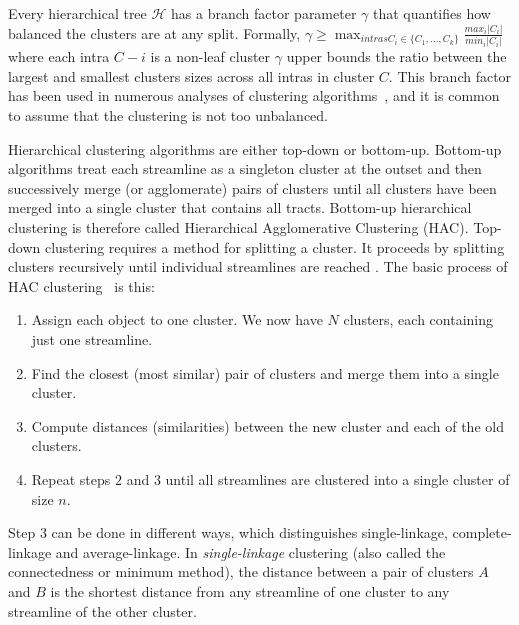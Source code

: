 Every hierarchical tree $\mathcal{H}$ has a branch factor parameter $\gamma$ that quantifies how balanced the clusters are at any split.
Formally, $\gamma \geq \max_{intras C_i \in \{C_1, \ldots,C_k\}} \frac{max_i |C_i|}{min_i |C_i|}$
 where each intra $C-i$ is a non-leaf cluster
 $\gamma$ upper bounds the ratio between the largest and smallest clusters sizes across all intras in cluster $C$. This branch factor has been used in numerous analyses of clustering algorithms~\cite{eriksson2011active,balakrishnan2011noise}, and it is common to assume that the clustering is not too unbalanced.

Hierarchical clustering algorithms are either top-down or bottom-up. Bottom-up algorithms treat each streamline as a singleton cluster at the outset and then successively merge (or agglomerate) pairs of clusters until all clusters have been merged into a single cluster that contains all tracts. Bottom-up hierarchical clustering is therefore called Hierarchical Agglomerative Clustering (HAC). Top-down clustering requires a method for splitting a cluster. It proceeds by splitting clusters recursively until individual streamlines are reached \cite{johnson1967hierarchical}.
The basic process of HAC clustering~\cite{johnson1967hierarchical} is this:
\begin{enumerate}
	\item Assign each object to one cluster. We now have $N$ clusters, each containing just one streamline.
	\item Find the closest (most similar) pair of clusters and merge them into a single cluster.
	\item Compute distances (similarities) between the new cluster and each of the old clusters.
	\item Repeat steps $2$ and $3$ until all streamlines are clustered into a single cluster of size $n$.
\end{enumerate}
Step $3$ can be done in different ways, which distinguishes single-linkage, complete-linkage and average-linkage.
In \emph{single-linkage} clustering (also called the connectedness or minimum method), the distance between a pair of clusters $A$ and $B$ is the shortest distance from any streamline of one cluster to any streamline of the other cluster. 
